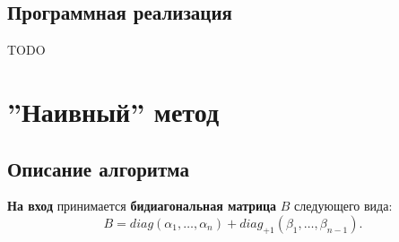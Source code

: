 \subsection{Программная реализация}

TODO






\newpage
\section{''Наивный'' метод}




\subsection{Описание алгоритма}
\textbf{На вход} принимается \textbf{бидиагональная матрица} \(B\) следующего вида:
\[
        B= diag(\alpha_1,\dots,\alpha_n)+diag_{+1}(\beta_1,\dots,\beta_{n-1}).
\]

